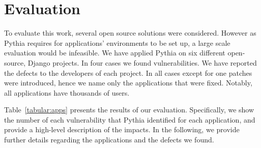 \section{Evaluation}
\label{sec:eval}

To evaluate this work, several open source solutions were considered.
However as Pythia requires for applications' environments
to be set up, a large scale evaluation would be infeasible.
We have applied Pythia on six
different open-source,
Django projects.
In four cases we found vulnerabilities.
We have reported the defects to
the developers of each project.
In all cases except for one patches were introduced,
hence we name only the applications that were fixed.
Notably,
all applications have thousands of users.

Table~\ref{tabular:apps} presents the results
of our evaluation.
Specifically,
we show the number of each vulnerability
that Pythia identified for each application,
and provide a high-level
description of the impacts.
In the following,
we provide further details
regarding the applications and the defects we found.




